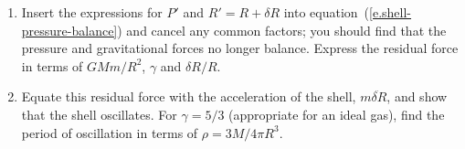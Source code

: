 \begin{exercisebox}
\begin{enumerate}
\item
Insert the expressions for $P'$ and $R'=R+\delta R$ into equation~(\ref{e.shell-pressure-balance}) and cancel any common factors; you should find that the pressure and gravitational forces no longer balance. Express the residual force in terms of $GMm/R^{2}$, $\gamma$ and $\delta R/R$.

\item
Equate this residual force with the acceleration of the shell, $m\ddot{\delta R}$, and show that the shell oscillates. For $\gamma = 5/3$ (appropriate for an ideal gas), find the period of oscillation in terms of $\rho = 3M/4\pi R^{3}$.
\end{enumerate}
\end{exercisebox}

